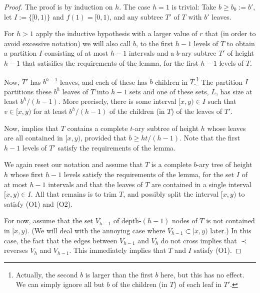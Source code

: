 \documentclass[kpfonts]{patmorin}
\begin{document}
\begin{proof}
  The proof is by induction on $h$.  The case $h=1$ is trivial: Take $b\ge b_0:=b'$, let $I:=\{[0,1)\}$ and $f(1)=[0,1)$, and any subtree $T'$ of $T$ with $b'$ leaves.
    
  For $h>1$ apply the inductive hypothesis with a larger value of $r$ that (in order to avoid excessive notation) we will also call $b$, to the first $h-1$ levels of $T$ to obtain a partition $I$ consisting of at most $h-1$ intervals and a $b$-ary subtree $T'$ of height $h-1$ that satisifies the requirements of the lemma, for the first $h-1$ levels of $T$.
  
  Now, $T'$ has $b^{h-1}$ leaves, and each of these has $b$ children in $T$.\footnote{Actually, the second $b$ is larger than the first $b$ here, but this has no effect.  We can simply ignore all but $b$ of the children (in $T$) of each leaf in $T'$.}  The partition $I$ partitions these $b^{h}$ leaves of $T$ into $h-1$ sets and one of these sets, $\overline{L}$, has size at least $b^{h}/(h-1)$. More precisely, there is some interval $[x,y)\in I$ such that $v\in [x,y)$ for at least $b^{h}/(h-1)$ of the children (in $T$) of the leaves of $T'$.
  
  Now,  implies that $T$ contains a complete $t$-ary subtree of height $h$ whose leaves are all contained in $[x,y)$, provided that $b\ge ht/(h-1)$.  Note that the first $h-1$ levels of $T'$ satisfy the requirements of the lemma.  
   
  We again reset our notation and assume that $T$ is a complete $b$-ary tree of height $h$ whose first $h-1$ levels satisfy the requirements of the lemma, for the set $I$ of at most $h-1$ intervals and that the leaves of $T$ are contained in a single interval $[x,y)\in I$.  All that remains is to trim $T$, and possibly split the interval $[x,y)$ to satisfy (O1) and (O2).

  For now, assume that the set $V_{h-1}$ of depth-$(h-1)$ nodes of $T$ is not contained in $[x,y)$.  (We will deal with the annoying case where $V_{h-1}\subset [x,y)$ later.)  In this case, the fact that the edges between $V_{h-1}$ and $V_h$ do not cross implies that $\prec$ reverses $V_h$ and $V_{h-1}$.  This immediately implies that $T$ and $I$ satisfy (O1).
  

\end{proof}
\end{document}
